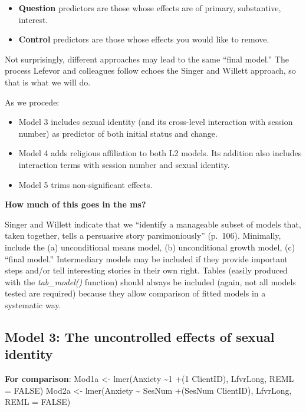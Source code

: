 \documentclass[
  11pt,
]{book}
\providecommand{\tightlist}{%
  \setlength{\itemsep}{0pt}\setlength{\parskip}{0pt}}
\begin{document}
\begin{itemize}
\tightlist
\item
  \textbf{Question} predictors are those whose effects are of primary, substantive, interest.
\item
  \textbf{Control} predictors are those whose effects you would like to remove.
\end{itemize}

Not surprisingly, different approaches may lead to the same ``final model.'' The process Lefevor and colleagues \citeyearpar{lefevor_religious_2017} follow echoes the Singer and Willett \citeyearpar{singer_applied_2003} approach, so that is what we will do.

As we procede:

\begin{itemize}
\tightlist
\item
  Model 3 includes sexual identity (and its cross-level interaction with session number) as predictor of both initial status and change.
\item
  Model 4 adds religious affiliation to both L2 models. Its addition also includes interaction terms with session number and sexual identity.
\item
  Model 5 trims non-significant effects.
\end{itemize}

\textbf{How much of this goes in the ms?}

Singer and Willett\citeyearpar{singer_applied_2003} indicate that we ``identify a manageable subset of models that, taken together, tells a persuasive story parsimoniously'' (p.~106). Minimally, include the (a) unconditional means model, (b) unconditional growth model, (c) ``final model.'' Intermediary models may be included if they provide important steps and/or tell interesting stories in their own right.
Tables (easily produced with the \emph{tab\_model()} function) should always be included (again, not all models tested are required) because they allow comparison of fitted models in a systematic way.

\hypertarget{model-3-the-uncontrolled-effects-of-sexual-identity}{%
\subsection{Model 3: The uncontrolled effects of sexual identity}\label{model-3-the-uncontrolled-effects-of-sexual-identity}}

\textbf{For comparison}:
Mod1a \textless- lmer(Anxiety \textasciitilde1 +(1 \textbar{} ClientID), LfvrLong, REML = FALSE)
Mod2a \textless- lmer(Anxiety \textasciitilde{} SesNum +(SesNum \textbar{} ClientID), LfvrLong, REML = FALSE)
\end{document}
